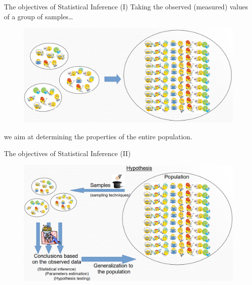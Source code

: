 \documentclass[
  ignorenonframetext,
]{beamer}
\begin{document}
\begin{frame}{The objectives of Statistical Inference (I)}
\protect\hypertarget{the-objectives-of-statistical-inference-i}{}
Taking the observed (measured) values of a group of samples\ldots{}

\begin{figure}
\includegraphics[width=0.8\linewidth]{images/statisticalinference1} \end{figure}

we aim at determining the properties of the entire population.
\end{frame}

\begin{frame}{The objectives of Statistical Inference (II)}
\protect\hypertarget{the-objectives-of-statistical-inference-ii}{}
\begin{figure}
\includegraphics[width=0.8\linewidth]{images/statisticalinference2} \end{figure}
\end{frame}
\end{document}
